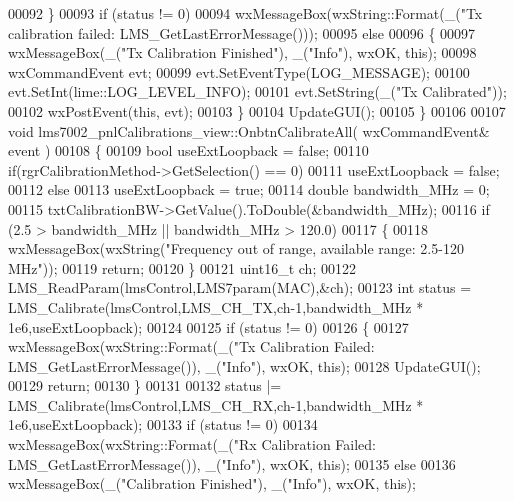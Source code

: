 \begin{DoxyCode}
{00092     \}
00093     \textcolor{keywordflow}{if} (status != 0)
00094         wxMessageBox(wxString::Format(\_(\textcolor{stringliteral}{"Tx calibration failed: %
      LMS_GetLastErrorMessage()));
00095     \textcolor{keywordflow}{else}
00096     \{
00097         wxMessageBox(\_(\textcolor{stringliteral}{"Tx Calibration Finished"}), \_(\textcolor{stringliteral}{"Info"}), wxOK, \textcolor{keyword}{this});
00098         wxCommandEvent evt;
00099         evt.SetEventType(LOG\_MESSAGE);
00100         evt.SetInt(lime::LOG_LEVEL_INFO);
00101         evt.SetString(\_(\textcolor{stringliteral}{"Tx Calibrated"}));
00102         wxPostEvent(\textcolor{keyword}{this}, evt);
00103     \}
00104     UpdateGUI();
00105 \}
00106 
00107 \textcolor{keywordtype}{void} lms7002_pnlCalibrations_view::OnbtnCalibrateAll( wxCommandEvent& event )
00108 \{
00109     \textcolor{keywordtype}{bool} useExtLoopback = \textcolor{keyword}{false};
00110     \textcolor{keywordflow}{if}(rgrCalibrationMethod->GetSelection() == 0)
00111         useExtLoopback = \textcolor{keyword}{false};
00112     \textcolor{keywordflow}{else}
00113         useExtLoopback = \textcolor{keyword}{true};
00114     \textcolor{keywordtype}{double} bandwidth\_MHz = 0;
00115     txtCalibrationBW->GetValue().ToDouble(&bandwidth\_MHz);
00116     \textcolor{keywordflow}{if} (2.5 > bandwidth\_MHz || bandwidth\_MHz > 120.0)
00117     \{
00118         wxMessageBox(wxString(\textcolor{stringliteral}{"Frequency out of range, available range: 2.5-120 MHz"}));
00119         \textcolor{keywordflow}{return};
00120     \}
00121     uint16\_t ch;
00122     LMS_ReadParam(lmsControl,LMS7param(MAC),&ch);
00123     \textcolor{keywordtype}{int} status = LMS_Calibrate(lmsControl,LMS_CH_TX,ch-1,bandwidth\_MHz * 1e6,useExtLoopback);
00124 
00125     \textcolor{keywordflow}{if} (status != 0)
00126     \{
00127         wxMessageBox(wxString::Format(\_(\textcolor{stringliteral}{"Tx Calibration Failed: %
      LMS_GetLastErrorMessage()), \_(\textcolor{stringliteral}{"Info"}), wxOK, \textcolor{keyword}{this});
00128         UpdateGUI();
00129         \textcolor{keywordflow}{return};
00130     \}
00131 
00132     status |= LMS_Calibrate(lmsControl,LMS_CH_RX,ch-1,bandwidth\_MHz * 1e6,useExtLoopback);
00133     \textcolor{keywordflow}{if} (status != 0)
00134         wxMessageBox(wxString::Format(\_(\textcolor{stringliteral}{"Rx Calibration Failed: %
      LMS_GetLastErrorMessage()), \_(\textcolor{stringliteral}{"Info"}), wxOK, \textcolor{keyword}{this});
00135     \textcolor{keywordflow}{else}
00136         wxMessageBox(\_(\textcolor{stringliteral}{"Calibration Finished"}), \_(\textcolor{stringliteral}{"Info"}), wxOK, \textcolor{keyword}{this});
}}}}
\end{DoxyCode}
